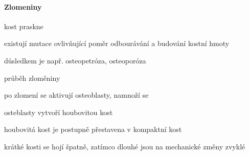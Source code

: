 \documentclass[DIV=8]{scrreprt}
\begin{document}
\paragraph{Zlomeniny}
\begin{myItemize}[nosep]
    \item kost praskne
    \item existují mutace ovlivňující poměr odbourávání a budování kostní hmoty
\begin{myItemize}[nosep]
    \item důsledkem je např. osteopetróza, osteoporóza
\end{myItemize}

    \item průběh zloměniny
\begin{myEnumerate}[nosep]
    \item po zlomení se aktivují osteoblasty, namnoží se
    \item osteblasty vytvoří houbovitou kost
    \item houbovitá kost je postupně přestavena v kompaktní kost
\end{myEnumerate}

    \item krátké kosti se hojí špatně, zatímco dlouhé jsou na mechanické změny zvyklé
\end{myItemize}
\end{document}
